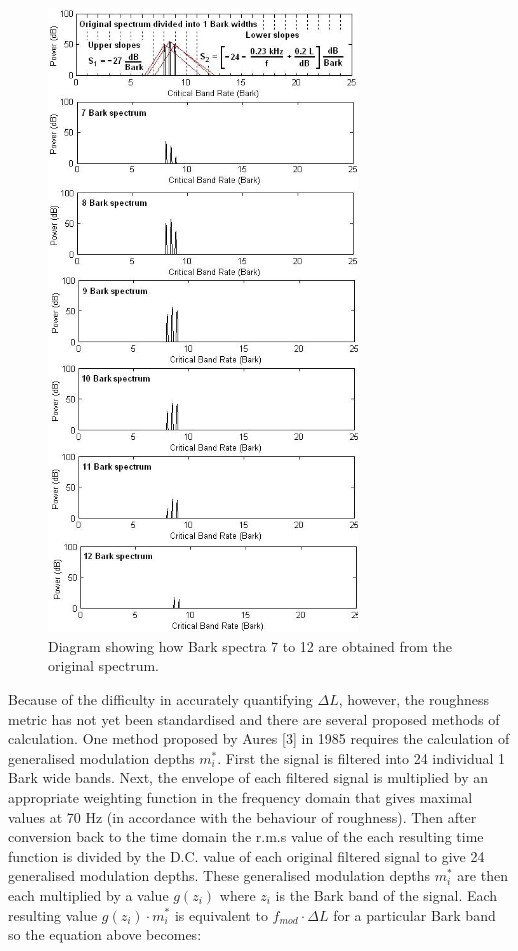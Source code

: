 \begin{figure}[h!]
\centering
\includegraphics[width=3.225in]{img/roughness-bark-spectrums.jpg}
\caption{Diagram showing how Bark spectra 7 to 12 are obtained from the
original spectrum.}
\end{figure}

\bigskip

Because of the difficulty in accurately quantifying $\Delta L$, however,
the roughness metric has not yet been standardised and there are several
proposed methods of calculation. One method proposed by Aures {[}3{]} in
1985 requires the calculation of generalised modulation depths
$m^*_i$. First the signal is filtered into 24 individual 1 Bark
wide bands. Next, the envelope of each filtered signal is multiplied by
an appropriate weighting function in the frequency domain that gives
maximal values at 70 Hz (in accordance with the behaviour of roughness).
Then after conversion back to the time domain the r.m.s value of the
each resulting time function is divided by the D.C. value of each
original filtered signal to give 24 generalised modulation depths. These
generalised modulation depths $m^*_i$ are then each multiplied by
a value $g(z_i)$ where $z_i$ is the Bark band of the signal. Each
resulting value $g(z_i) \cdot m^*_i$ is equivalent to $f_{mod}
\cdot \Delta L$ for a particular Bark band so the equation above becomes:

